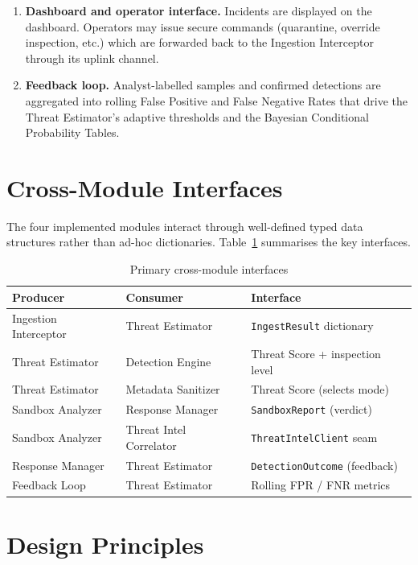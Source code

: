 \documentclass[12pt, a4paper]{report}
\begin{document}
\begin{enumerate}
    \item \textbf{Dashboard and operator interface.} Incidents are
          displayed on the dashboard. Operators may issue secure commands
          (quarantine, override inspection, etc.) which are forwarded back
          to the Ingestion Interceptor through its uplink channel.

    \item \textbf{Feedback loop.} Analyst-labelled samples and confirmed
          detections are aggregated into rolling False Positive and False
          Negative Rates that drive the Threat Estimator's adaptive
          thresholds and the Bayesian Conditional Probability Tables.
\end{enumerate}

\section{Cross-Module Interfaces}

The four implemented modules interact through well-defined typed data
structures rather than ad-hoc dictionaries. Table~\ref{tab:interfaces}
summarises the key interfaces.

\begin{table}[H]
\centering
\caption{Primary cross-module interfaces}
\label{tab:interfaces}
\begin{tabular}{|l|l|l|}
\hline
\textbf{Producer} & \textbf{Consumer} & \textbf{Interface} \\
\hline
Ingestion Interceptor & Threat Estimator & \texttt{IngestResult} dictionary \\
\hline
Threat Estimator & Detection Engine & Threat Score + inspection level \\
\hline
Threat Estimator & Metadata Sanitizer & Threat Score (selects mode) \\
\hline
Sandbox Analyzer & Response Manager & \texttt{SandboxReport} (verdict) \\
\hline
Sandbox Analyzer & Threat Intel Correlator & \texttt{ThreatIntelClient} seam \\
\hline
Response Manager & Threat Estimator & \texttt{DetectionOutcome} (feedback) \\
\hline
Feedback Loop & Threat Estimator & Rolling FPR / FNR metrics \\
\hline
\end{tabular}
\end{table}

\section{Design Principles}
\end{document}
